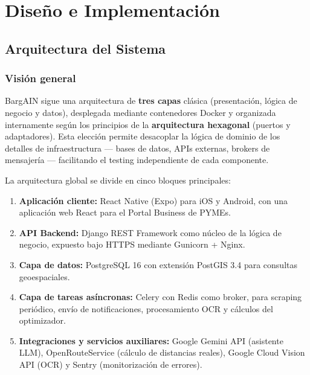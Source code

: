 
\chapter{Dise\~no e Implementaci\'on}\label{cap08}

\section{Arquitectura del Sistema}\label{sec:arquitectura}

\subsection{Visi\'on general}\label{subsec:vision-general}

BargAIN sigue una arquitectura de \textbf{tres capas} cl\'asica (presentaci\'on, l\'ogica de
negocio y datos), desplegada mediante contenedores Docker y organizada internamente seg\'un los
principios de la \textbf{arquitectura hexagonal} (puertos y adaptadores). Esta elecci\'on permite
desacoplar la l\'ogica de dominio de los detalles de infraestructura --- bases de datos, APIs
externas, brokers de mensajer\'ia --- facilitando el testing independiente de cada componente.

La arquitectura global se divide en cinco bloques principales:

\begin{enumerate}
  \item \textbf{Aplicaci\'on cliente:} React Native (Expo) para iOS y Android, con una aplicaci\'on
    web React para el Portal Business de PYMEs.
  \item \textbf{API Backend:} Django REST Framework como n\'ucleo de la l\'ogica de negocio,
    expuesto bajo HTTPS mediante Gunicorn + Nginx.
  \item \textbf{Capa de datos:} PostgreSQL 16 con extensi\'on PostGIS 3.4 para consultas
    geoespaciales.
  \item \textbf{Capa de tareas as\'incronas:} Celery con Redis como broker, para scraping
    peri\'odico, env\'io de notificaciones, procesamiento OCR y c\'alculos del optimizador.
  \item \textbf{Integraciones y servicios auxiliares:} Google Gemini API (asistente LLM),
    OpenRouteService (c\'alculo de distancias reales), Google Cloud Vision API (OCR) y Sentry
    (monitorizaci\'on de errores).
\end{enumerate}

